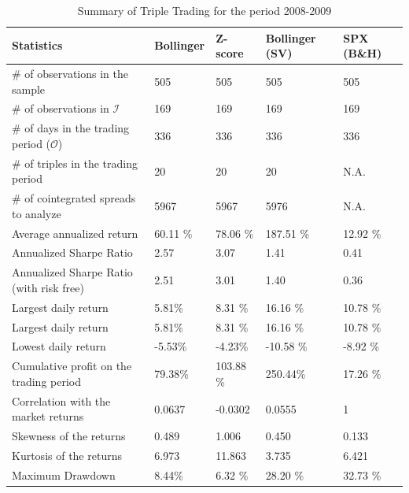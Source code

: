 \documentclass[11pt,a4,twosided,singlespacing,titlepagenumber=on]{scrreprt}
\numberwithin{equation}{chapter} %
\theoremstyle{remark}
\begin{document}
\renewcommand{\arraystretch}{1}%
\begin{table}[H]
\centering
\begin{tabular}{lllll}
\hline
Statistics  			& Bollinger & Z-score & Bollinger (SV) & SPX (B\&H)\\
\hline
\# of observations in the sample								    & 505       &505      & 505    & 505\\
\# of observations in $\mathcal{I}$						      & 169       &169      & 169    & 169\\
\# of days in the trading period ($\mathcal{O}$)    & 336       &336      & 336    & 336\\
\# of triples in the trading period   							& 20        &20       & 20     & N.A.\\
\# of cointegrated spreads to analyze 				      & 5967      &5967     & 5976   & N.A.\\
Average annualized return 										      & 60.11 \%  &78.06 \% & 187.51 \%& 12.92 \%\\
Annualized Sharpe Ratio 										        & 2.57      &3.07     & 1.41   & 0.41\\
Annualized Sharpe Ratio (with risk free)            & 2.51      &3.01     & 1.40   & 0.36\\
Largest daily return 											          & 5.81\%    &8.31 \%  & 16.16 \% & 10.78 \%\\
Largest daily return 											          & 5.81\%    &8.31 \%  & 16.16 \% & 10.78 \%\\
Lowest daily return 											          & -5.53\%   &-4.23\%  & -10.58 \% & -8.92 \%\\
Cumulative profit on the trading period             & 79.38\%   &103.88 \%& 250.44\% & 17.26 \% \\
Correlation with the market returns 							  & 0.0637    &-0.0302  & 0.0555 & 1\\
Skewness of the returns														  & 0.489     &1.006    & 0.450 & 0.133\\
Kurtosis of the returns														  & 6.973     &11.863   & 3.735 & 6.421 \\
Maximum Drawdown  												          & 8.44\%    &6.32 \%  & 28.20 \% & 32.73 \%\\
\hline
\end{tabular}
\caption{Summary of Triple Trading for the period 2008-2009}
\end{table}
\end{document}
